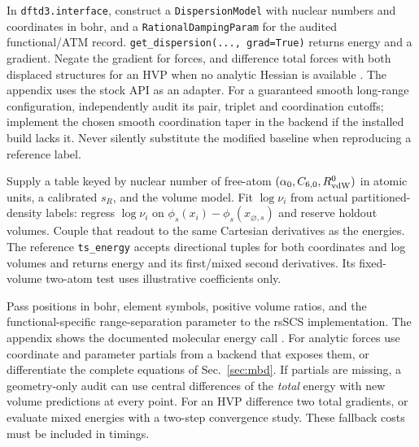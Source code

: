 \documentclass[11pt,a4paper]{article}
\begin{document}
\begin{description}[leftmargin=3mm,style=nextline]
\item[D3(BJ).] In \texttt{dftd3.interface}, construct a \texttt{DispersionModel} with nuclear numbers and coordinates in bohr, and a \texttt{RationalDampingParam} for the audited functional/ATM record. \texttt{get\_dispersion(..., grad=True)} returns energy and a gradient. Negate the gradient for forces, and difference total forces with both displaced structures for an HVP when no analytic Hessian is available \cite{d3api}. The appendix uses the stock API as an adapter. For a guaranteed smooth long-range configuration, independently audit its pair, triplet and coordination cutoffs; implement the chosen smooth coordination taper in the backend if the installed build lacks it. Never silently substitute the modified baseline when reproducing a reference label.
\item[TS.] Supply a table keyed by nuclear number of free-atom $(\alpha_0,C_{6,0},R^0_{\rm vdW})$ in atomic units, a calibrated $s_R$, and the volume model. Fit $\log\nu_i$ from actual partitioned-density labels: regress $\log\nu_i$ on $\phi_s(x_i)-\phi_s(x_{\varnothing,s})$ and reserve holdout volumes. Couple that readout to the same Cartesian derivatives as the energies. The reference \texttt{ts\_energy} accepts directional tuples for both coordinates and log volumes and returns energy and its first/mixed second derivatives. Its fixed-volume two-atom test uses illustrative coefficients only.
\item[MBD@rsSCS.] Pass positions in bohr, element symbols, positive volume ratios, and the functional-specific range-separation parameter to the rsSCS implementation. The appendix shows the documented molecular energy call \cite{libmbd}. For analytic forces use coordinate and parameter partials from a backend that exposes them, or differentiate the complete equations of Sec.~\ref{sec:mbd}. If partials are missing, a geometry-only audit can use central differences of the \emph{total} energy with new volume predictions at every point. For an HVP difference two total gradients, or evaluate mixed energies with a two-step convergence study. These fallback costs must be included in timings.
\end{description}
\end{document}
